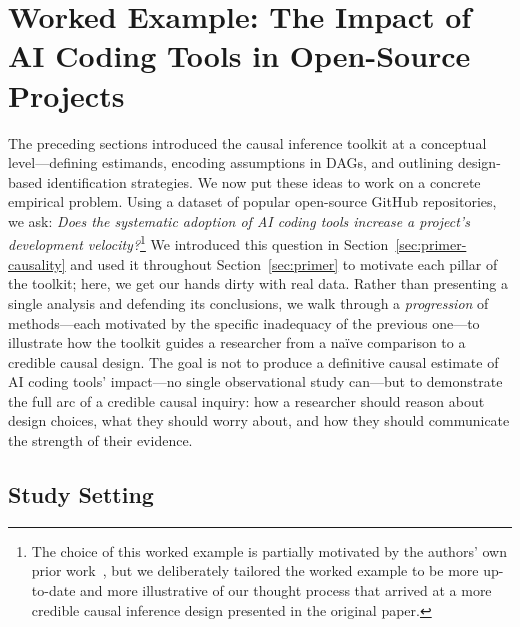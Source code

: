 \section{Worked Example: The Impact of AI Coding Tools in Open-Source Projects}
\label{sec:worked-example}

The preceding sections introduced the causal inference toolkit at a conceptual level---defining estimands, encoding assumptions in DAGs, and outlining design-based identification strategies.
We now put these ideas to work on a concrete empirical problem.
Using a dataset of popular open-source GitHub repositories, we ask: \emph{Does the systematic adoption of AI coding tools increase a project's development velocity?}\footnote{The choice of this worked example is partially motivated by the authors' own prior work~\cite{DBLP:conf/msr/HeMAKV26}, but we deliberately tailored the worked example to be more up-to-date and more illustrative of our thought process that arrived at a more credible causal inference design presented in the original paper.}
We introduced this question in Section~\ref{sec:primer-causality} and used it throughout Section~\ref{sec:primer} to motivate each pillar of the toolkit; here, we get our hands dirty with real data.
Rather than presenting a single analysis and defending its conclusions, we walk through a \emph{progression} of methods---each motivated by the specific inadequacy of the previous one---to illustrate how the toolkit guides a researcher from a na\"ive comparison to a credible causal design.
The goal is not to produce a definitive causal estimate of AI coding tools' impact---no single observational study can---but to demonstrate the full arc of a credible causal inquiry: how a researcher should reason about design choices, what they should worry about, and how they should communicate the strength of their evidence.

\subsection{Study Setting}
\label{sec:study-setting}

